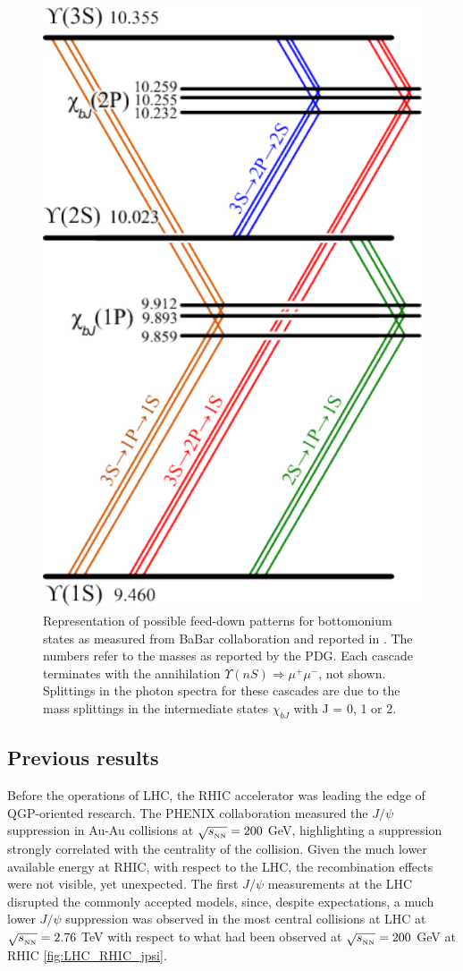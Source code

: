\begin{figure}[!t]
\begin{center}
\includegraphics[width=0.45\linewidth]{Chapters/Analysis/Figs/BottomoniumSpectro.pdf}
\caption{Representation of possible feed-down patterns for bottomonium states as measured from BaBar collaboration and reported in \cite{Lees:2014qea}. The numbers refer to the masses as reported by the PDG. Each cascade terminates with the annihilation $\Upsilon(nS)\Rightarrow\mu^+\mu^-$, not shown. Splittings in the photon spectra for these cascades are due to the mass splittings in the intermediate states $\chi_{bJ}$ with J = 0, 1 or 2.}
\label{fig:BBSpectro}
\end{center}
\end{figure}

\subsection{Previous results}
Before the operations of LHC, the RHIC accelerator was leading the edge of QGP-oriented research.
The PHENIX collaboration measured the $J/\psi$ suppression in Au-Au collisions at $\sqrt{s_{_{\rm NN}}}=200$ GeV, highlighting a suppression strongly correlated with the centrality of the collision.
Given the much lower available energy at RHIC, with respect to the LHC, the recombination effects were not visible, yet unexpected.
The first $J/\psi$ measurements at the LHC disrupted the commonly accepted models, since, despite expectations, a much lower $J/\psi$ suppression was observed in the most central collisions at LHC at $\sqrt{s_{_{\rm NN}}}=2.76$ \rm{TeV} with respect to what had been observed at $\sqrt{s_{_{\rm NN}}}=200$ GeV at RHIC \ref{fig:LHC_RHIC_jpsi}.

